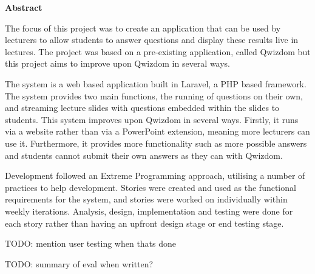 \thispagestyle{empty}

\begin{center}
    {\LARGE\bf Abstract}
\end{center}

The focus of this project was to create an application that can be used by lecturers to allow students to answer questions and display these results live in lectures. The project was based on a pre-existing application, called Qwizdom but this project aims to improve upon Qwizdom in several ways.

The system is a web based application built in Laravel, a PHP based framework. The system provides two main functions, the running of questions on their own, and streaming lecture slides with questions embedded within the slides to students. This system improves upon Qwizdom in several ways. Firstly, it runs via a website rather than via a PowerPoint extension, meaning more lecturers can use it. Furthermore, it provides more functionality such as more possible answers and students cannot submit their own answers as they can with Qwizdom.

Development followed an Extreme Programming approach, utilising a number of practices to help development. Stories were created and used as the functional requirements for the system, and stories were worked on individually within weekly iterations. Analysis, design, implementation and testing were done for each story rather than having an upfront design stage or end testing stage.

TODO: mention user testing when thats done

TODO: summary of eval when written?